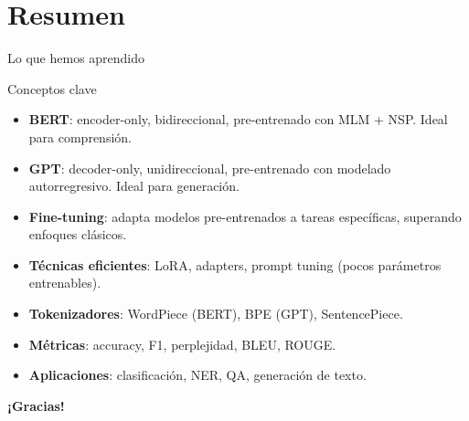 \documentclass[aspectratio=169, 10pt, xcolor=table]{beamer}
\begin{document}


\section{Resumen}

\begin{frame}{Lo que hemos aprendido}
    \begin{exampleblock}{Conceptos clave}
        \begin{itemize}
            \item \textbf{BERT}: encoder-only, bidireccional, pre-entrenado con MLM + NSP. Ideal para comprensión.
            \item \textbf{GPT}: decoder-only, unidireccional, pre-entrenado con modelado autorregresivo. Ideal para generación.
            \item \textbf{Fine-tuning}: adapta modelos pre-entrenados a tareas específicas, superando enfoques clásicos.
            \item \textbf{Técnicas eficientes}: LoRA, adapters, prompt tuning (pocos parámetros entrenables).
            \item \textbf{Tokenizadores}: WordPiece (BERT), BPE (GPT), SentencePiece.
            \item \textbf{Métricas}: accuracy, F1, perplejidad, BLEU, ROUGE.
            \item \textbf{Aplicaciones}: clasificación, NER, QA, generación de texto.
        \end{itemize}
    \end{exampleblock}
\end{frame}

\begin{frame}
    \centering
    \Huge \textbf{¡Gracias!}

\end{frame}
\end{document}

